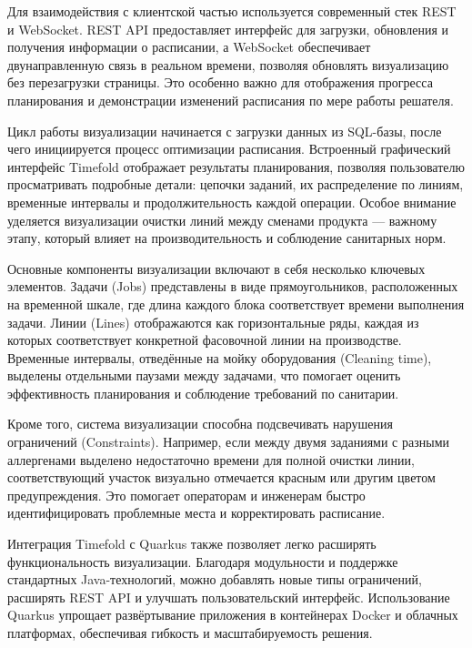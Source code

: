 Для взаимодействия с клиентской частью используется современный стек REST и WebSocket. REST API предоставляет интерфейс для загрузки, обновления и получения информации о расписании, а WebSocket обеспечивает двунаправленную связь в реальном времени, позволяя обновлять визуализацию без перезагрузки страницы. Это особенно важно для отображения прогресса планирования и демонстрации изменений расписания по мере работы решателя.

Цикл работы визуализации начинается с загрузки данных из SQL-базы, после чего инициируется процесс оптимизации расписания. Встроенный графический интерфейс Timefold отображает результаты планирования, позволяя пользователю просматривать подробные детали: цепочки заданий, их распределение по линиям, временные интервалы и продолжительность каждой операции. Особое внимание уделяется визуализации очистки линий между сменами продукта — важному этапу, который влияет на производительность и соблюдение санитарных норм.

Основные компоненты визуализации включают в себя несколько ключевых элементов. Задачи (Jobs) представлены в виде прямоугольников, расположенных на временной шкале, где длина каждого блока соответствует времени выполнения задачи. Линии (Lines) отображаются как горизонтальные ряды, каждая из которых соответствует конкретной фасовочной линии на производстве. Временные интервалы, отведённые на мойку оборудования (Cleaning time), выделены отдельными паузами между задачами, что помогает оценить эффективность планирования и соблюдение требований по санитарии.

Кроме того, система визуализации способна подсвечивать нарушения ограничений (Constraints). Например, если между двумя заданиями с разными аллергенами выделено недостаточно времени для полной очистки линии, соответствующий участок визуально отмечается красным или другим цветом предупреждения. Это помогает операторам и инженерам быстро идентифицировать проблемные места и корректировать расписание.

Интеграция Timefold с Quarkus также позволяет легко расширять функциональность визуализации. Благодаря модульности и поддержке стандартных Java-технологий, можно добавлять новые типы ограничений, расширять REST API и улучшать пользовательский интерфейс. Использование Quarkus упрощает развёртывание приложения в контейнерах Docker и облачных платформах, обеспечивая гибкость и масштабируемость решения.

